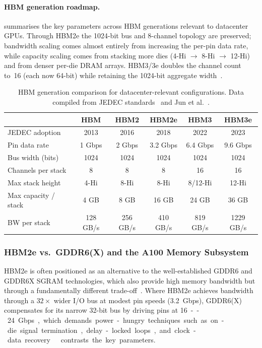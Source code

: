 \paragraph{HBM generation roadmap.}
 summarises the key parameters across HBM
generations relevant to datacenter GPUs. Through HBM2e the 1024-bit bus
and 8-channel topology are preserved; bandwidth scaling comes almost
entirely from increasing the per-pin data rate, while capacity scaling
comes from stacking more dies (4-Hi $\to$ 8-Hi $\to$ 12-Hi) and from
denser per-die DRAM arrays. HBM3/3e doubles the channel count to~16
(each now 64-bit) while retaining the 1024-bit aggregate
width~\cite{jun2017hbm,jedec2020hbm2e}.

\begin{table}[H]
\centering
\caption{HBM generation comparison for datacenter-relevant configurations.
  Data compiled from JEDEC standards~\cite{jedec2013hbm,jedec2016hbm2,jedec2020hbm2e}
  and Jun et al.~\cite{jun2017hbm}.}
\label{tab:hbm-generations}
\begin{tabular}{l c c c c c}
\toprule
& HBM & HBM2 & HBM2e & HBM3 & HBM3e \\
\midrule
JEDEC adoption         & 2013    & 2016    & 2018     & 2022    & 2023 \\
Pin data rate          & 1 Gbps  & 2 Gbps  & 3.2 Gbps & 6.4 Gbps & 9.6 Gbps \\
Bus width (bits)       & 1024    & 1024    & 1024     & 1024    & 1024 \\
Channels per stack     & 8       & 8       & 8        & 16      & 16 \\
Max stack height       & 4-Hi    & 8-Hi    & 8-Hi     & 8/12-Hi & 12-Hi \\
Max capacity / stack   & 4 GB    & 8 GB    & 16 GB    & 24 GB   & 36 GB \\
BW per stack           & 128 GB/s & 256 GB/s & 410 GB/s & 819 GB/s & 1229 GB/s \\
\bottomrule
\end{tabular}
\end{table}

\subsubsection{HBM2e vs.\ GDDR6(X) and the A100 Memory Subsystem}
\label{sec:hbm-generations}

HBM2e is often positioned as an alternative to the well-established
GDDR6 and GDDR6X SGRAM technologies, which also provide high memory
bandwidth but through a fundamentally different
trade-off~\cite{micron2021hbm2e}. Where HBM2e achieves bandwidth through a
$32\times$ wider I/O bus at modest pin speeds (\SI{3.2}{Gbps}), GDDR6(X)
compensates for its narrow 32-bit bus by driving pins at
\SI{16}--\SI{24}{Gbps}, which demands power-hungry techniques such as
on-die signal termination, delay-locked loops, and clock-data
recovery~\cite{micron2021hbm2e}.  contrasts the
key parameters.

